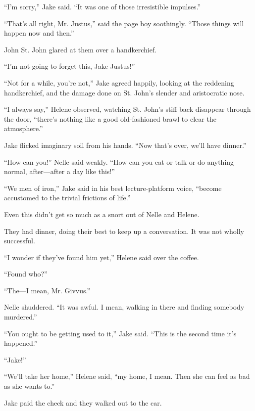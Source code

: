 \documentclass{novel}
\begin{document}
\begin{ChapterStart}
\vspace{3\nbs}
\end{ChapterStart}

“I'm sorry,” Jake said. “It was one of those irresistible impulses.”

“That’s all right, Mr. Justus,” said the page boy soothingly. “Those things will happen now and then.”

John St. John glared at them over a handkerchief.

“I'm not going to forget this, Jake Justus!”

“Not for a while, you’re not,” Jake agreed happily, looking at the reddening handkerchief, and the damage done on St. John’s slender and aristocratic nose.

“I always say,” Helene observed, watching St. John’s stiff back disappear through the door, “there’s nothing like a good old-fashioned brawl to clear the atmosphere.”

Jake flicked imaginary soil from his hands. “Now that’s over, we’ll have dinner.”

“How can you!” Nelle said weakly. “How can you eat or talk or do anything normal, after—after a day like this!”

“We men of iron,” Jake said in his best lecture-platform voice, “become accustomed to the trivial frictions of life.”

Even this didn’t get so much as a snort out of Nelle and Helene.

They had dinner, doing their best to keep up a conversation. It was not wholly successful.

“I wonder if they’ve found him yet,” Helene said over the coffee.

“Found who?”

“The—I mean, Mr. Givvus.”

Nelle shuddered. “It was awful. I mean, walking in there and finding somebody murdered.”

“You ought to be getting used to it,” Jake said. “This is the second time it’s happened.”

“Jake!”

“We’ll take her home,” Helene said, “my home, I mean. Then she can feel as bad as she wants to.”

Jake paid the check and they walked out to the car.
\end{document}
